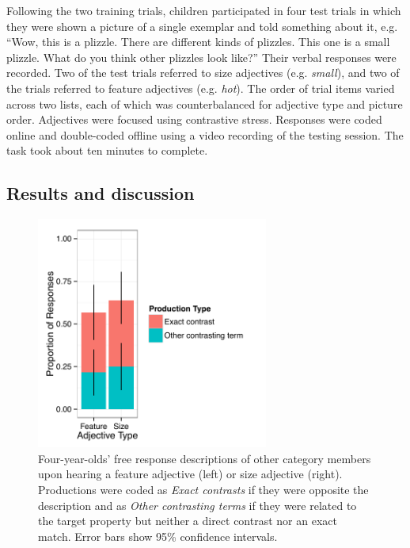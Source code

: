 \documentclass[man]{apa2}
\begin{document}
Following the two training trials, children participated in four test trials in which they were shown a picture of a single exemplar and told something about it, e.g. ``Wow, this is a plizzle. There are different kinds of plizzles. This one is a small plizzle.  What do you think other plizzles look like?'' Their verbal responses were recorded.  Two of the test trials referred to size adjectives (e.g. \emph{small}), and two of the trials referred to feature adjectives (e.g. \emph{hot}).  The order of trial items varied across two lists, each of which was counterbalanced for adjective type and picture order.  Adjectives were focused using contrastive stress. Responses were coded online and double-coded offline using a video recording of the testing session.  The task took about ten minutes to complete. 

\subsection{Results and discussion}

\begin{figure}[t] 
  \begin{center} 
    \includegraphics[width=3in]{figures/expt3.pdf} 
    \caption{\label{fig:freeResponse} Four-year-olds' free response descriptions of other category members upon hearing a feature adjective (left) or size adjective (right). Productions were coded as \emph{Exact contrasts} if they were opposite the description and as \emph{Other contrasting terms} if they were related to the target property but neither a direct contrast nor an exact match. Error bars show 95\% confidence intervals. }
  \end{center} 
\vspace{-10ex}
\end{figure}
\end{document}
